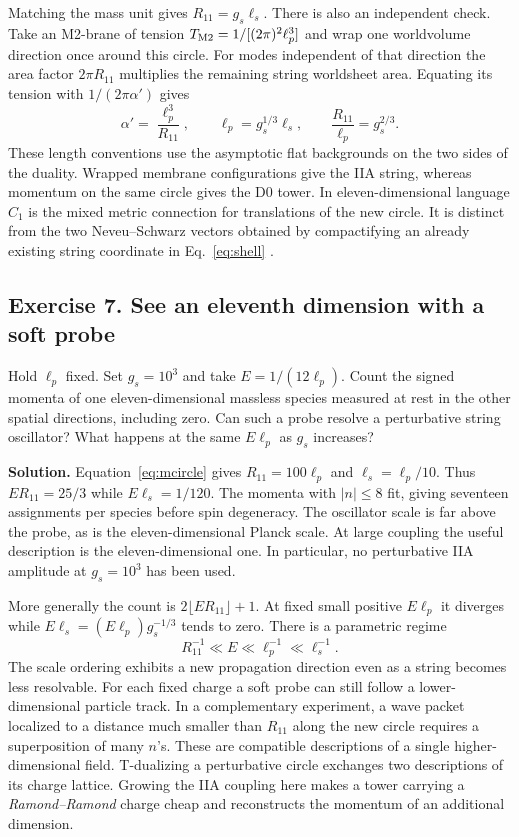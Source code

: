 \documentclass[10pt]{article}
\begin{document}
Matching the mass unit gives $R_{11}=g_s\ell_s$. There is also an independent check. Take an M2-brane of tension $T_{\rm M2}=1/[(2\pi)^2\ell_p^3]$ and wrap one worldvolume direction once around this circle. For modes independent of that direction the area factor $2\pi R_{11}$ multiplies the remaining string worldsheet area. Equating its tension with $1/(2\pi\alpha')$ gives
\begin{equation}
 \alpha'=\frac{\ell_p^3}{R_{11}},\qquad
 \ell_p=g_s^{1/3}\ell_s,\qquad
 \frac{R_{11}}{\ell_p}=g_s^{2/3}.
 \label{eq:mcircle}
\end{equation}
These length conventions use the asymptotic flat backgrounds on the two sides of the duality. Wrapped membrane configurations give the IIA string, whereas momentum on the same circle gives the D0 tower. In eleven-dimensional language $C_1$ is the mixed metric connection for translations of the new circle. It is distinct from the two Neveu--Schwarz vectors obtained by compactifying an already existing string coordinate in Eq.~\eqref{eq:shell} \cite{DHIS1987,Witten1995Circle}.

\subsection{Exercise 7. See an eleventh dimension with a soft probe}
Hold $\ell_p$ fixed. Set $g_s=10^3$ and take $E=1/(12\ell_p)$. Count the signed momenta of one eleven-dimensional massless species measured at rest in the other spatial directions, including zero. Can such a probe resolve a perturbative string oscillator? What happens at the same $E\ell_p$ as $g_s$ increases?

\noindent\textbf{Solution.}
Equation~\eqref{eq:mcircle} gives $R_{11}=100\ell_p$ and $\ell_s=\ell_p/10$. Thus $ER_{11}=25/3$ while $E\ell_s=1/120$. The momenta with $|n|\le8$ fit, giving seventeen assignments per species before spin degeneracy. The oscillator scale is far above the probe, as is the eleven-dimensional Planck scale. At large coupling the useful description is the eleven-dimensional one. In particular, no perturbative IIA amplitude at $g_s=10^3$ has been used.

More generally the count is $2\lfloor ER_{11}\rfloor+1$. At fixed small positive $E\ell_p$ it diverges while $E\ell_s=(E\ell_p)g_s^{-1/3}$ tends to zero. There is a parametric regime
\begin{equation}
 R_{11}^{-1}\ll E\ll\ell_p^{-1}\ll\ell_s^{-1}.
 \label{eq:mband}
\end{equation}
The scale ordering exhibits a new propagation direction even as a string becomes less resolvable. For each fixed charge a soft probe can still follow a lower-dimensional particle track. In a complementary experiment, a wave packet localized to a distance much smaller than $R_{11}$ along the new circle requires a superposition of many $n$'s. These are compatible descriptions of a single higher-dimensional field. T-dualizing a perturbative circle exchanges two descriptions of its charge lattice. Growing the IIA coupling here makes a tower carrying a \emph{Ramond--Ramond} charge cheap and reconstructs the momentum of an additional dimension.
\end{document}
